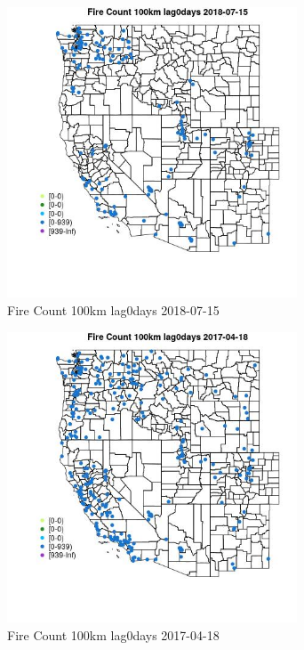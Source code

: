 \begin{figure} 
\centering  
\includegraphics[width=0.77\textwidth]{Code_Outputs/Report_ML_input_PM25_Step4_part_e_de_duplicated_aves_compiled_2019-05-20wNAs_MapObsFire_Count_100km_lag0days2018-07-15.jpg} 
\caption{\label{fig:Report_ML_input_PM25_Step4_part_e_de_duplicated_aves_compiled_2019-05-20wNAsMapObsFire_Count_100km_lag0days2018-07-15}Fire Count 100km lag0days 2018-07-15} 
\end{figure} 
 

\begin{figure} 
\centering  
\includegraphics[width=0.77\textwidth]{Code_Outputs/Report_ML_input_PM25_Step4_part_e_de_duplicated_aves_compiled_2019-05-20wNAs_MapObsFire_Count_100km_lag0days2017-04-18.jpg} 
\caption{\label{fig:Report_ML_input_PM25_Step4_part_e_de_duplicated_aves_compiled_2019-05-20wNAsMapObsFire_Count_100km_lag0days2017-04-18}Fire Count 100km lag0days 2017-04-18} 
\end{figure} 
 

